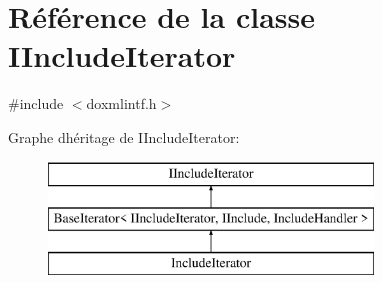 \hypertarget{class_i_include_iterator}{}\section{Référence de la classe I\+Include\+Iterator}
\label{class_i_include_iterator}


{\ttfamily \#include $<$doxmlintf.\+h$>$}

Graphe d\textquotesingle{}héritage de I\+Include\+Iterator\+:\begin{figure}[H]
\begin{center}
\leavevmode
\includegraphics[height=3.000000cm]{class_i_include_iterator}
\end{center}
\end{figure}
